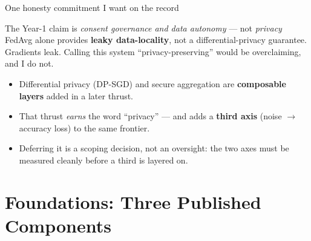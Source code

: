 \documentclass[aspectratio=169, 11pt]{beamer}
\begin{document}
\begin{frame}{One honesty commitment I want on the record}
\begin{alertblock}{The Year-1 claim is \emph{consent governance and data
autonomy} --- not \emph{privacy}}
FedAvg alone provides \textbf{leaky data-locality}, not a differential-privacy
guarantee. Gradients leak. Calling this system ``privacy-preserving'' would be
overclaiming, and I do not.
\end{alertblock}
\vspace{0.6em}
\begin{itemize}
\item Differential privacy (DP-SGD) and secure aggregation are
      \textbf{composable layers} added in a later thrust.
\item That thrust \emph{earns} the word ``privacy'' --- and adds a
      \textbf{third axis} (noise $\rightarrow$ accuracy loss) to the same
      frontier.
\item Deferring it is a scoping decision, not an oversight: the two axes must
      be measured cleanly before a third is layered on.
\end{itemize}
\end{frame}

\section{Foundations: Three Published Components}
\end{document}
